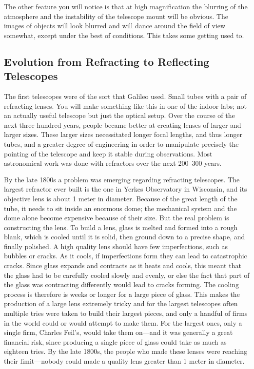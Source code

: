 \documentclass[12pt, preprint]{aastex}
\begin{document}
The other feature you will notice is that at high magnification the
blurring of the atmosphere and the instability of the telescope mount
will be obvious. The images of objects will look blurred and will
dance around the field of view somewhat, except under the best of
conditions. This takes some getting used to.

\subsection{Evolution from Refracting to Reflecting Telescopes}

The first telescopes were of the sort that Galileo used. Small tubes
with a pair of refracting lenses. You will make something like this in
one of the indoor labs; not an actually useful telescope but just the
optical setup. Over the course of the next three hundred years, people
became better at creating lenses of larger and larger sizes. These
larger sizes necessitated longer focal lengths, and thus longer tubes,
and a greater degree of engineering in order to manipulate precisely
the pointing of the telescope and keep it stable during observations.
Most astronomical work was done with refractors over the next 200--300
years.

By the late 1800s a problem was emerging regarding refracting
telescopes. The largest refractor ever built is the one in Yerkes
Observatory in Wisconsin, and its objective lens is about 1 meter in
diameter. Because of the great length of the tube, it needs to sit
inside an enormous dome; the mechanical system and the dome alone
become expensive because of their size. But the real problem is
constructing the lens. To build a lens, glass is melted and formed
into a rough blank, which is cooled until it is solid, then ground
down to a precise shape, and finally polished. A high quality lens
should have few imperfections, such as bubbles or cracks. As it cools,
if imperfections form they can lead to catastrophic cracks. Since
glass expands and contracts as it heats and cools, this meant that the
glass had to be carefully cooled slowly and evenly, or else the fact
that part of the glass was contracting differently would lead to
cracks forming. The cooling process is therefore is weeks or longer
for a large piece of glass. This makes the production of a large lens
extremely tricky and for the largest telescopes often multiple tries
were taken to build their largest pieces, and only a handful of firms
in the world could or would attempt to make them. For the largest
ones, only a single firm, Charles Feil's, would take them on---and it
was generally a great financial risk, since producing a single piece
of glass could take as much as eighteen tries.  By the late 1800s, the
people who made these lenses were reaching their limit---nobody could
made a quality lens greater than 1 meter in diameter.
\end{document}
